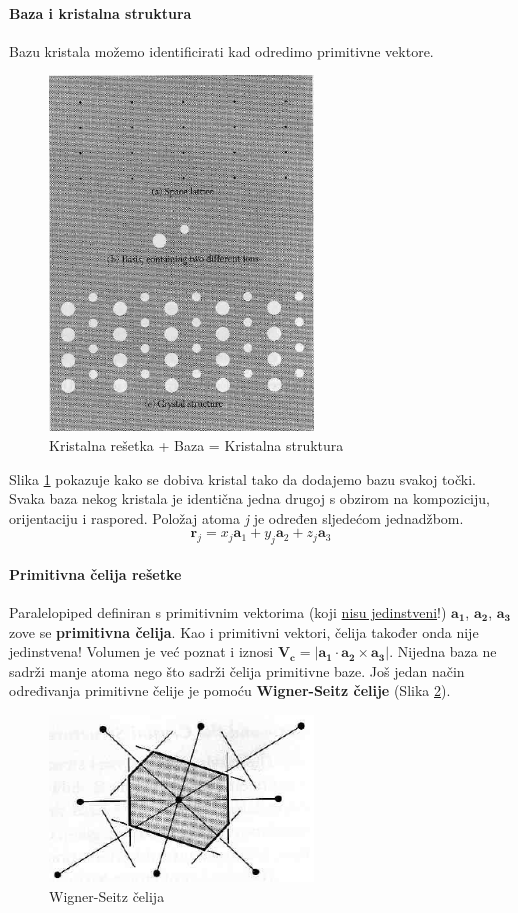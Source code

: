 \documentclass{article}
\numberwithin{equation}{section}
\begin{document}
\paragraph{Baza i kristalna struktura}

Bazu kristala možemo identificirati kad odredimo primitivne vektore. 
\begin{figure}[h!]
    \centering
    \includegraphics[width=7cm]{Slika_1.PNG}
    \caption{Kristalna rešetka + Baza = Kristalna struktura}
    \label{fig:S1}
\end{figure}
Slika \ref{fig:S1} pokazuje kako se dobiva kristal tako da dodajemo bazu svakoj točki. Svaka baza nekog kristala je identična jedna drugoj s obzirom na kompoziciju, orijentaciju i raspored. 
Položaj atoma \textit{j} je određen sljedećom jednadžbom.
\begin{equation}
    \mathbf{r}_{j}=x_{j} \mathbf{a}_{1}+y_{j} \mathbf{a}_{2}+z_{j} \mathbf{a}_{3}
    \label{EQ3}
\end{equation}
\paragraph{Primitivna čelija rešetke}
Paralelopiped definiran s primitivnim vektorima (koji \underline{nisu jedinstveni}!) $\mathbf{a_1}$, $\mathbf{a_2}$, $\mathbf{a_3}$ 
zove se \textbf{primitivna čelija}. Kao i primitivni vektori, čelija također onda nije jedinstvena! Volumen je već poznat i iznosi 
$\mathbf{V_c}=\left|\mathbf{a_1} \cdot \mathbf{a_2} \times \mathbf{a_3}\right|$. 
Nijedna baza ne sadrži manje atoma nego što sadrži čelija primitivne baze. Još jedan način određivanja primitivne čelije je pomoću 
\textbf{Wigner-Seitz čelije} (Slika \ref{fig:S2}).
\begin{figure}[h!]
    \centering
    \includegraphics[width=7cm]{Slika_2.PNG}
    \caption{Wigner-Seitz čelija}
    \label{fig:S2}
\end{figure}
\end{document}
